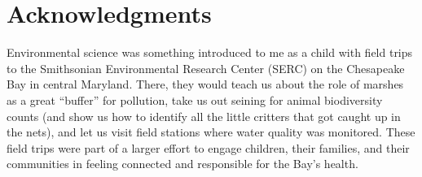 \chapter{Acknowledgments}
Environmental science was something introduced to me as a child with field trips to the Smithsonian Environmental Research Center (SERC) on the Chesapeake Bay in central Maryland. 
There, they would teach us about the role of marshes as a great ``buffer'' for pollution, take us out seining for animal biodiversity counts (and show us how to identify all the little critters that got caught up in the nets), and let us visit field stations where water quality was monitored.
These field trips were part of a larger effort to engage children, their families, and their communities in feeling connected and responsible for the Bay's health.